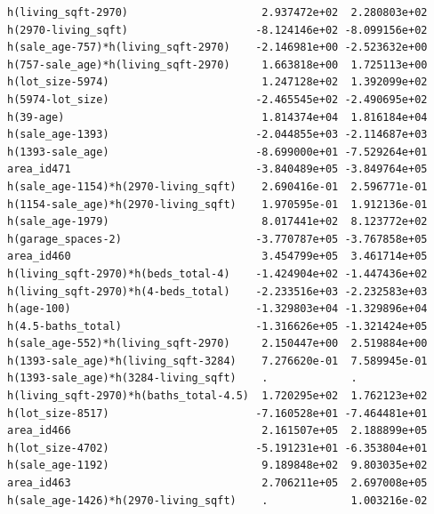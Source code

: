 \documentclass[
]{article}
\begin{document}
\begin{verbatim}
h(living_sqft-2970)                     2.937472e+02  2.280803e+02
h(2970-living_sqft)                    -8.124146e+02 -8.099156e+02
h(sale_age-757)*h(living_sqft-2970)    -2.146981e+00 -2.523632e+00
h(757-sale_age)*h(living_sqft-2970)     1.663818e+00  1.725113e+00
h(lot_size-5974)                        1.247128e+02  1.392099e+02
h(5974-lot_size)                       -2.465545e+02 -2.490695e+02
h(39-age)                               1.814374e+04  1.816184e+04
h(sale_age-1393)                       -2.044855e+03 -2.114687e+03
h(1393-sale_age)                       -8.699000e+01 -7.529264e+01
area_id471                             -3.840489e+05 -3.849764e+05
h(sale_age-1154)*h(2970-living_sqft)    2.690416e-01  2.596771e-01
h(1154-sale_age)*h(2970-living_sqft)    1.970595e-01  1.912136e-01
h(sale_age-1979)                        8.017441e+02  8.123772e+02
h(garage_spaces-2)                     -3.770787e+05 -3.767858e+05
area_id460                              3.454799e+05  3.461714e+05
h(living_sqft-2970)*h(beds_total-4)    -1.424904e+02 -1.447436e+02
h(living_sqft-2970)*h(4-beds_total)    -2.233516e+03 -2.232583e+03
h(age-100)                             -1.329803e+04 -1.329896e+04
h(4.5-baths_total)                     -1.316626e+05 -1.321424e+05
h(sale_age-552)*h(living_sqft-2970)     2.150447e+00  2.519884e+00
h(1393-sale_age)*h(living_sqft-3284)    7.276620e-01  7.589945e-01
h(1393-sale_age)*h(3284-living_sqft)    .             .           
h(living_sqft-2970)*h(baths_total-4.5)  1.720295e+02  1.762123e+02
h(lot_size-8517)                       -7.160528e+01 -7.464481e+01
area_id466                              2.161507e+05  2.188899e+05
h(lot_size-4702)                       -5.191231e+01 -6.353804e+01
h(sale_age-1192)                        9.189848e+02  9.803035e+02
area_id463                              2.706211e+05  2.697008e+05
h(sale_age-1426)*h(2970-living_sqft)    .             1.003216e-02
                                                                  

\end{verbatim}
\end{document}
